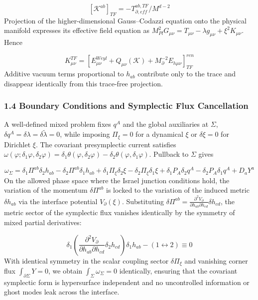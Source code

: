 \documentclass[aps,prd,onecolumn,superscriptaddress,nofootinbib,longbibliography,10pt]{revtex4-2}
\begin{document}
  \[ [\mathcal{K}^{ab}]_{TF} = -T^{ab,TF}_{\partial,eff} / M^{d-2} \]
  Projection of the higher-dimensional Gauss–Codazzi equation onto the physical manifold expresses its effective field equation as \(M_{Pl}^2 G_{\mu\nu} = T_{\mu\nu} - \lambda g_{\mu\nu} + \xi^2 K_{\mu\nu}\). Hence


  \[ K^{TF}_{\mu\nu} = \left[ E^{Weyl}_{\mu\nu} + Q_{\mu\nu}(\mathcal{K}) + M_\partial^{-2} E_{h\mu\nu} \right]^{ren}_{TF} \]
  Additive vacuum terms proportional to \(h_{ab}\) contribute only to the trace and disappear identically from this trace-free projection.



  
\subsubsection*{1.4 Boundary Conditions and Symplectic Flux Cancellation}

  A well-defined mixed problem fixes \(q^A\) and the global auxiliaries at \(\Sigma\), \(\delta q^A = \delta\lambda = \delta\tilde{\lambda} = 0\), while imposing \(\Pi_\xi = 0\) for a dynamical \(\xi\) or \(\delta\xi = 0\) for Dirichlet \(\xi\). The covariant presymplectic current satisfies \(\omega(\varphi; \delta_1\varphi, \delta_2\varphi) = \delta_1\theta(\varphi, \delta_2\varphi) - \delta_2\theta(\varphi, \delta_1\varphi)\). Pullback to \(\Sigma\) gives


  \[ \omega_\Sigma = \delta_1\Pi^{ab}\delta_2 h_{ab} - \delta_2\Pi^{ab}\delta_1 h_{ab} + \delta_1\Pi_\xi \delta_2\xi - \delta_2\Pi_\xi \delta_1\xi + \delta_1 P_A \delta_2 q^A - \delta_2 P_A \delta_1 q^A + D_a Y^a \]
  On the allowed phase space where the Israel junction conditions hold, the variation of the momentum \(\delta\Pi^{ab}\) is locked to the variation of the induced metric \(\delta h_{ab}\) via the interface potential \(V_\partial(\xi)\). Substituting \(\delta\Pi^{ab} = \frac{\partial^2 V_\partial}{\partial h_{ab}\partial h_{cd}}\delta h_{cd}\), the metric sector of the symplectic flux vanishes identically by the symmetry of mixed partial derivatives:


  \[ \delta_1\left( \frac{\partial^2 V_\partial}{\partial h_{ab}\partial h_{cd}}\delta_2 h_{cd} \right)\delta_1 h_{ab} - (1 \leftrightarrow 2) \equiv 0 \]
  With identical symmetry in the scalar coupling sector \(\delta\Pi_\xi\) and vanishing corner flux \(\int_{\partial\Sigma} Y = 0\), we obtain \(\int_\Sigma \omega_\Sigma = 0\) identically, ensuring that the covariant symplectic form is hypersurface independent and no uncontrolled information or ghost modes leak across the interface.
\end{document}
